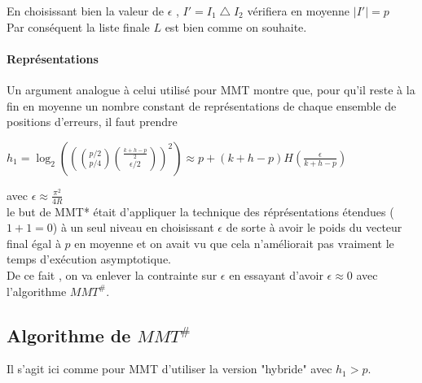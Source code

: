 \documentclass[12pt,openany]{report}
\begin{document}
En choisissant bien la valeur de $\epsilon $ , $I'=I_1\bigtriangleup I_2 $ vérifiera en moyenne $\mid I' \mid=p  $\\
Par conséquent la liste finale $L $ est bien comme on souhaite.
\paragraph{Représentations} Un argument analogue à celui utilisé pour MMT montre
que, pour qu’il reste à la fin en moyenne un nombre constant de représentations
de chaque ensemble de positions d’erreurs, il faut prendre \vspace{0.2cm} 

{\large
$ h_1=\log_2\left(\left({{p/2}\choose{p/4}} {{\frac{k+h-p}{2}}\choose{\epsilon/2}} \right)^2  \right)\approx p+(k+h-p)H(\frac{\epsilon}{k+h-p}) $}

avec {\large $\epsilon\approx \frac{\pi^2}{4R} $ }\\
le but de MMT*
était d’appliquer la technique des réprésentations étendues ($1 + 1 = 0$) à un seul
niveau en choisissant  $ \epsilon$ de sorte à avoir le poids du vecteur final
égal à $p$ en moyenne et on avait vu que cela n’améliorait pas vraiment le temps
d’exécution asymptotique.\\
De ce fait , on va enlever la contrainte sur $\epsilon $ en essayant d'avoir $\epsilon \approx 0 $ avec l'algorithme $ MMT^{\#}$.

\subsection{Algorithme de $ MMT^{\#}  $}
 
 Il s'agit ici comme pour MMT d'utiliser la version "hybride" avec $ h_1>p  $.
\end{document}

